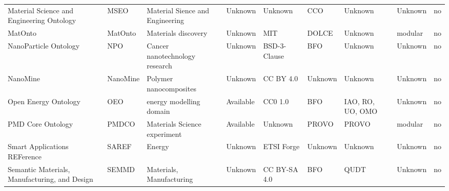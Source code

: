 \begin{table}
\begin{tabular}{m{5cm}m{2cm}m{5cm}m{2cm}m{2cm}m{2cm}m{2cm}m{2cm}m{2cm}}
                            Material Science and Engineering Ontology &                    MSEO &                                                   Material Sience and Engineering &              Unknown &      Unknown &                          CCO &           Unknown &    Unknown &               no \\
                                                                          MatOnto &                 MatOnto &                                                               Materials discovery &              Unknown &         MIT  &                        DOLCE &           Unknown &    modular &               no \\
                                        NanoParticle Ontology &                     NPO &                                                    Cancer nanotechnology research &              Unknown & BSD-3-Clause &                          BFO &           Unknown &    Unknown &               no \\
                                                NanoMine &                NanoMine &                                                            Polymer nanocomposites &              Unknown &    CC BY 4.0 &                      Unknown &           Unknown &    Unknown &               no \\
                                         Open Energy Ontology &                     OEO &                                                           energy modelling domain &            Available &      CC0 1.0 &                          BFO &  IAO, RO, UO, OMO &    Unknown &               no \\
                                                   PMD Core Ontology &                   PMDCO &                                                      Materials Science experiment &            Available &      Unknown &                        PROVO &             PROVO &    modular &               no \\
                               Smart Applications REFerence &                   SAREF &                                                                            Energy &              Unknown &   ETSI Forge &                      Unknown &           Unknown &    Unknown &               no \\
                                    Semantic Materials, Manufacturing, and Design &                   SEMMD &                                                          Materials, Manufacturing &              Unknown & CC BY-SA 4.0 &                          BFO &              QUDT &    Unknown &               no \\

\end{tabular}
\end{table}
